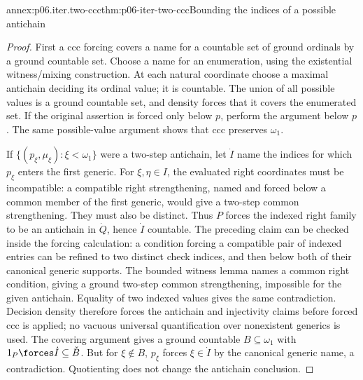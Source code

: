 \begin{annexitem}{annex:p06.iter.two-ccc}{thm:p06-iter-two-ccc}{Bounding the indices of a possible antichain}
\begin{proof}
First a ccc forcing covers a name for a countable set of ground ordinals
by a ground countable set. Choose a name for an enumeration, using the
existential witness/mixing construction. At each natural coordinate
choose a maximal antichain deciding its ordinal value; it is countable.
The union of all possible values is a ground countable set, and density
forces that it covers the enumerated set. If the original assertion is
forced only below \(p\), perform the argument below \(p\).
The same possible-value argument shows that ccc preserves \(\omega_1\).

If \(\{(p_\xi,\mu_\xi):\xi<\omega_1\}\) were a two-step antichain,
let \(\dot I\) name the indices for which \(p_\xi\) enters the first
generic. For \(\xi,\eta\in I\), the evaluated right coordinates
must be incompatible: a compatible right strengthening, named and forced
below a common member of the first generic, would give a two-step
common strengthening. They must also be distinct. Thus \(P\) forces
the indexed right family to be an antichain in \(\dot Q\), hence
\(\dot I\) countable. The preceding claim can be checked inside the
forcing calculation: a condition forcing a compatible pair of indexed
entries can be refined to two distinct check indices, and then below
both of their canonical generic supports. The bounded witness lemma
names a common right condition, giving a ground two-step common
strengthening, impossible for the given antichain. Equality of two
indexed values gives the same contradiction. Decision density therefore
forces the antichain and injectivity claims before forced ccc is applied;
no vacuous universal quantification over nonexistent generics is used.
The covering argument gives a ground countable
\(B\subseteq\omega_1\) with \(1_P\forces\dot I\subseteq\check B\).
But for \(\xi\notin B\), \(p_\xi\) forces \(\xi\in\dot I\)
by the canonical generic name, a contradiction. Quotienting does not
change the antichain conclusion.
\end{proof}
\end{annexitem}

